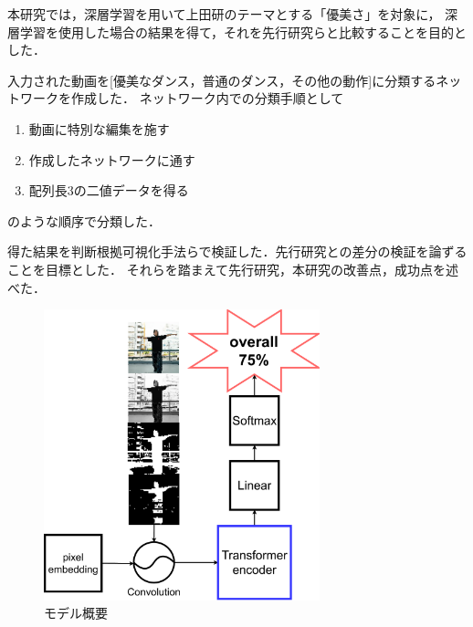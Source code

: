 本研究では，深層学習を用いて上田研のテーマとする「優美さ」を対象に，
深層学習を使用した場合の結果を得て，それを先行研究らと比較することを目的とした．

入力された動画を[優美なダンス，普通のダンス，その他の動作]に分類するネットワークを作成した．
ネットワーク内での分類手順として
\begin{enumerate}
  \item 動画に特別な編集を施す
  \item 作成したネットワークに通す
  \item 配列長3の二値データを得る
\end{enumerate}
のような順序で分類した．

得た結果を判断根拠可視化手法らで検証した．先行研究との差分の検証を論ずることを目標とした．
それらを踏まえて先行研究，本研究の改善点，成功点を述べた．

\begin{figure}[b]
  \begin{center}
    \includegraphics[width=80mm]{images/easy_chart.pdf}
  \end{center}
  \caption{モデル概要}
  \label{easy_chart}
\end{figure}

\clearpage
